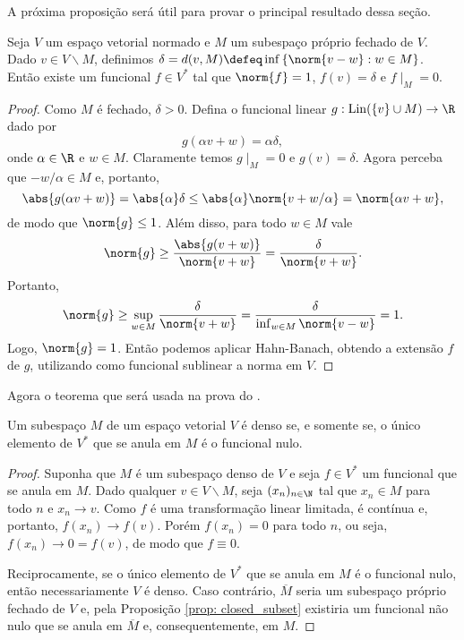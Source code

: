 A próxima proposição será útil para provar o principal resultado dessa seção.
\begin{prop}
    Seja \( V \) um espaço vetorial normado e \( M \) um subespaço próprio fechado de \( V \).
    Dado \( v \in V \backslash M \), definimos \( \delta = d(v, M) \defeq \inf \left\{ \norm{ v - w } : w \in M \right\} \).
    Então existe um funcional \( f \in V^{ * } \) tal que \( \norm{ f } = 1 \), \( f(v) = \delta \) e \( f  \mid_{ M } = 0 \).
    \label{prop: closed_subset}
\end{prop}
\begin{proof}
    Como \( M \) é fechado, \( \delta > 0 \).
    Defina o funcional linear \( g : \lin ( \left\{ v \right\} \cup M ) \to \R \) dado por \[
        g(\alpha v + w) = \alpha \delta
    ,\]
    onde \( \alpha \in \R \) e \( w \in M \).
    Claramente temos \( g \mid_{ M } = 0 \) e \( g(v) = \delta \).
    Agora perceba que \( -w/\alpha \in M \) e, portanto, \[
        \abs{ g(\alpha v + w) } = \abs{ \alpha } \delta \leq \abs{ \alpha } \norm{ v + w / \alpha } = \norm{ \alpha v + w }
    ,\]
    de modo que \( \norm{ g } \leq 1 \).
    Além disso, para todo \( w \in M \) vale \[
        \norm{ g } \geq \frac{ \abs{ g(v + w) } }{ \norm{ v + w } } = \frac{ \delta }{ \norm{ v + w } }
    .\]
    Portanto, \[
        \norm{ g } \geq \sup_{ w \in M } \frac{ \delta }{ \norm{ v + w } } = \frac{ \delta }{ \inf_{ w \in M } \norm{ v - w } } = 1
    .\]
    Logo, \( \norm{ g } = 1 \).
    Então podemos aplicar Hahn-Banach, obtendo a extensão \( f \) de \( g \), utilizando como funcional sublinear a norma em \( V \).
\end{proof}

Agora o teorema que será usada na prova do \uat.

\begin{teo}
    Um subespaço \( M \) de um espaço vetorial \( V \) é denso se, e somente se, o único elemento de \( V^{ * } \) que se anula em \( M \) é o funcional nulo.
    \label{thm: hahn_banach_corolary}
\end{teo}
\begin{proof}
    Suponha que \( M \) é um subespaço denso de \( V \) e seja \( f \in V^{ * } \) um funcional que se anula em \( M \).
    Dado qualquer \( v \in V \backslash M \), seja \( ( x_{ n } )_{ n \in \N } \) tal que \( x_{ n } \in M \) para todo \( n \) e \( x_{ n } \to v \).
    Como \( f \) é uma transformação linear limitada, é contínua e, portanto, \( f(x_{ n }) \to f(v) \).
    Porém \( f(x_{ n }) = 0 \) para todo \( n \), ou seja, \( f(x_{ n }) \to 0 = f(v) \), de modo que \( f \equiv 0 \).

    Reciprocamente, se o único elemento de \( V^{ * } \) que se anula em \( M \) é o funcional nulo, então necessariamente \( V \) é denso.
    Caso contrário, \( \overline{M} \) seria um subespaço próprio fechado de \( V \) e, pela Proposição \ref{prop: closed_subset} existiria um funcional não nulo que se anula em \( \overline{M} \) e, consequentemente, em \( M \).
\end{proof}